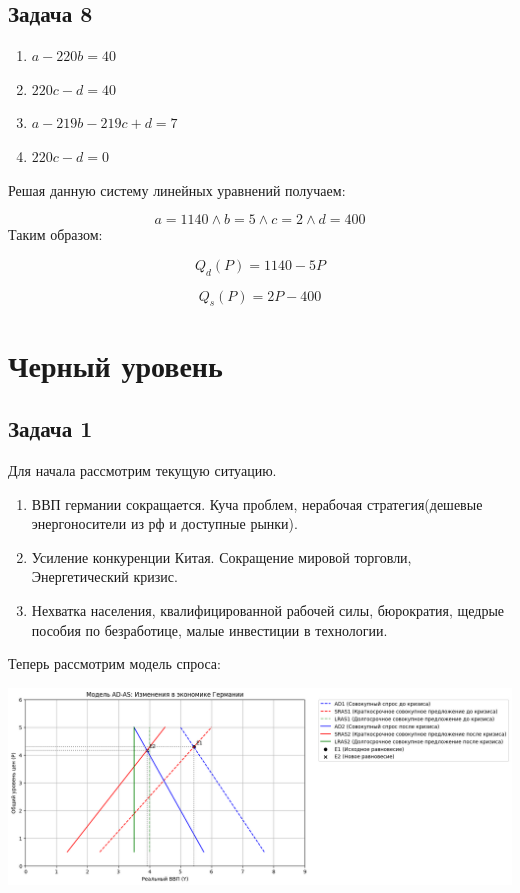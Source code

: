 \documentclass[a4paper,12pt]{article}
\begin{document}
\subsection{Задача 8}
\begin{enumerate}
    \item $a-220b=40$
    \item $220c-d=40$
    \item $a-219b-219c+d=7$
    \item $220c-d=0$
\end{enumerate}

Решая данную систему линейных уравнений получаем:

\[
a=1140 \land b = 5 \land c = 2 \land d = 400
\]
Таким образом:

\[
Q_d(P) = 1140 - 5P
\]

\[
Q_s(P) = 2P-400
\]

\section{Черный уровень}
\subsection{Задача 1}

Для начала рассмотрим текущую ситуацию.
\begin{enumerate} 
    \item ВВП германии сокращается. Куча проблем, нерабочая стратегия(дешевые энергоносители из рф и доступные рынки).
    \item Усиление конкуренции Китая. Сокращение мировой торговли, Энергетический кризис.
    \item Нехватка населения, квалифицированной рабочей силы, бюрократия, щедрые пособия по безработице, малые инвестиции в технологии.
\end{enumerate}

Теперь рассмотрим модель спроса:

\includegraphics[scale=0.7]{graphs/2.3.png}
\end{document}
